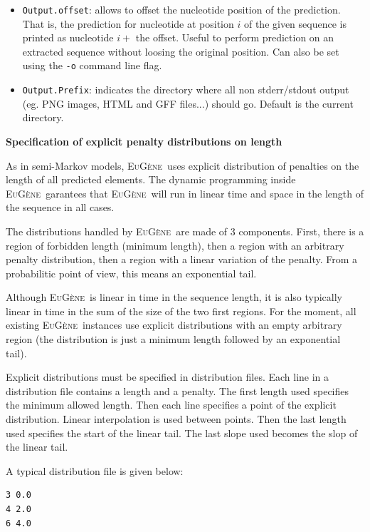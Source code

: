 \documentclass[a4paper,titlepage]{report}
\newcommand{\EuGene}{\textsc{EuG\`ene}}
\begin{document}
\begin{itemize}
\item \texttt{Output.offset}: allows to offset the nucleotide position
  of the prediction.  That is, the prediction for nucleotide at
  position $i$ of the given sequence is printed as nucleotide $i+$ the
  offset. Useful to perform prediction on an extracted sequence
  without loosing the original position. Can also be set using the
  \texttt{-o} command line flag. 
  
\item \texttt{Output.Prefix}: indicates the directory where all non
  stderr/stdout output (eg. PNG images, HTML and GFF files...) should go.
  Default is the current directory.
\end{itemize}

{\bf Specification of explicit penalty distributions on length}

As in semi-Markov models, \EuGene\ uses explicit distribution of
penalties on the length of all predicted elements. The dynamic
programming inside \EuGene\ garantees that \EuGene\ will run in linear
time and space in the length of the sequence in all cases.

The distributions handled by \EuGene\ are made of 3 components. First,
there is a region of forbidden length (minimum length), then a region
with an arbitrary penalty distribution, then a region with a linear
variation of the penalty. From a probabilitic point of view, this means
an exponential tail.

Although \EuGene\ is linear in time in the sequence length, it is also
typically linear in time in the sum of the size of the two first
regions. For the moment, all existing \EuGene\ instances use explicit
distributions with an empty arbitrary region (the distribution is just
a minimum length followed by an exponential tail).

Explicit distributions must be specified in distribution files. Each
line in a distribution file contains a length and a penalty. The first
length used specifies the minimum allowed length. Then each line
specifies a point of the explicit distribution. Linear interpolation
is used between points. Then the last length used specifies the start
of the linear tail. The last slope used becomes the slop of the linear
tail.

A
typical distribution file is given below:
\begin{Verbatim}
3 0.0
4 2.0
6 4.0
\end{Verbatim}
\end{document}
